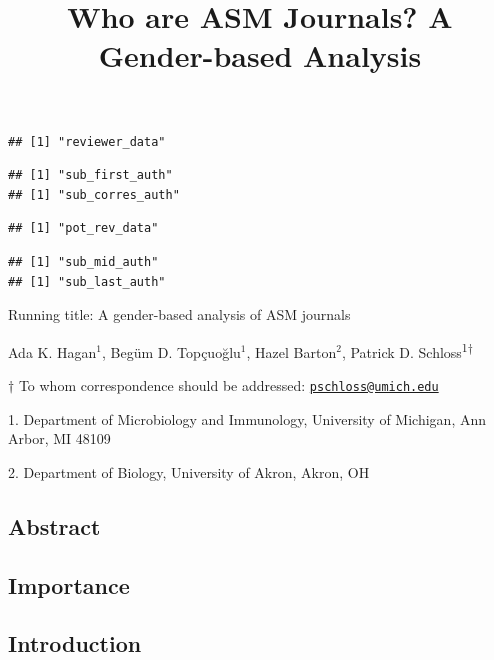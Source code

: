 \documentclass[11pt,]{article}
\title{\textbf{Who are ASM Journals? A Gender-based Analysis}}
\author{}
\date{}
\begin{document}
\maketitle

\begin{verbatim}
## [1] "reviewer_data"
\end{verbatim}

\begin{verbatim}
## [1] "sub_first_auth"
## [1] "sub_corres_auth"
\end{verbatim}

\begin{verbatim}
## [1] "pot_rev_data"
\end{verbatim}

\begin{verbatim}
## [1] "sub_mid_auth"
## [1] "sub_last_auth"
\end{verbatim}

\vspace{35mm}

Running title: A gender-based analysis of ASM journals

\vspace{35mm}

Ada K. Hagan\({^1}\), Begüm D. Topçuoğlu\({^1}\), Hazel Barton\({^2}\),
Patrick D. Schloss\textsuperscript{1\(\dagger\)}

\vspace{40mm}

\(\dagger\) To whom correspondence should be addressed:
\href{mailto:pschloss@umich.edu}{\nolinkurl{pschloss@umich.edu}}

1. Department of Microbiology and Immunology, University of Michigan,
Ann Arbor, MI 48109

2. Department of Biology, University of Akron, Akron, OH

\newpage

\linenumbers

\subsection{Abstract}\label{abstract}

\subsection{Importance}\label{importance}

\subsection{Introduction}\label{introduction}
\end{document}
